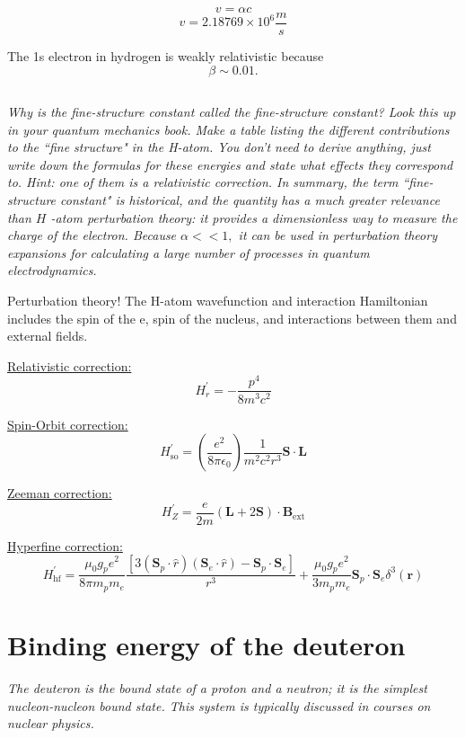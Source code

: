 \documentclass[12pt, letterpaper]{article}
\begin{document}
$$
v=\alpha c 
$$
$$
v=2.18769 \times 10^{6} \frac{m}{s}
$$

The 1s electron in hydrogen is weakly relativistic because 
$$
\beta \sim 0.01. 
$$

\subsection{}
\textit{Why is the fine-structure constant called the fine-structure constant? Look this up in your quantum mechanics book. Make a table listing the different contributions to the ``fine structure" in the H-atom. You don't need to derive anything, just write down the formulas for these energies and state what effects they correspond to. Hint: one of them is a relativistic correction. In summary, the term ``fine-structure constant" is historical,
and the quantity has a much greater relevance than $H$ -atom perturbation theory: it provides a dimensionless way to measure the charge of the electron. Because $\alpha<<1,$ it can be used in perturbation theory expansions for calculating a large number of processes in quantum electrodynamics.}


Perturbation theory! The H-atom wavefunction and interaction Hamiltonian includes the spin of the e, spin of the nucleus, and interactions between them and external fields.

\underline{Relativistic correction:}
$$
H_{r}^{\prime}=-\frac{p^{4}}{8 m^{3} c^{2}}
$$

\underline{Spin-Orbit correction:}
$$
H_{\mathrm{so}}^{\prime}=\left(\frac{e^{2}}{8 \pi \epsilon_{0}}\right) \frac{1}{m^{2} c^{2} r^{3}} \mathbf{S} \cdot \mathbf{L}
$$

\underline{Zeeman correction:}
$$
H_{Z}^{\prime}=\frac{e}{2 m}(\mathbf{L}+2 \mathbf{S}) \cdot \mathbf{B}_{\mathrm{ext}}
$$

\underline{Hyperfine correction:}
$$
H_{\mathrm{hf}}^{\prime}=\frac{\mu_{0} g_{p} e^{2}}{8 \pi m_{p} m_{e}} \frac{\left[3\left(\mathbf{S}_{p} \cdot \hat{r}\right)\left(\mathbf{S}_{e} \cdot \hat{r}\right)-\mathbf{S}_{p} \cdot \mathbf{S}_{e}\right]}{r^{3}}+\frac{\mu_{0} g_{p} e^{2}}{3 m_{p} m_{e}} \mathbf{S}_{p} \cdot \mathbf{S}_{e} \delta^{3}(\mathbf{r})
$$

\section{Binding energy of the deuteron}
\textit{The deuteron is the bound state of a proton and a neutron; it is the simplest nucleon-nucleon bound state. This system is typically discussed in courses on nuclear physics.}
\end{document}
